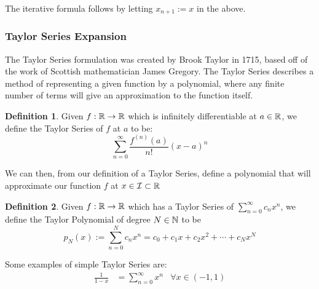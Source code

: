 The iterative formula follows by letting \(x_{n+1} := x\) in the above.\\




\subsubsection{Taylor Series Expansion}
\label{SUBSUB_"Taylor Series"}
\theoremstyle{definition}
\newtheorem{Taylor Series}{Definition}[subsubsection]
\newtheorem{Taylor Polynomial}[Taylor Series]{Definition}

The Taylor Series formulation was created by Brook Taylor in 1715, based off of the work of Scottish mathematician James Gregory. The Taylor Series describes a method of representing a given function by a polynomial, where any finite number of terms will give an approximation to the function itself.

\begin{Taylor Series}
\label{DEF_"Taylor Series"}
Given \(f : \mathbb{R} \to \mathbb{R}\) which is infinitely differentiable at \(a \in \mathbb{R}\), we define the Taylor Series of \(f\) at \(a\) to be:
\[\sum_{n=0}^{\infty} \frac{f^{(n)}(a)}{n!}(x-a)^n\]
\end{Taylor Series}

We can then, from our definition of a Taylor Series, define a polynomial that will approximate our function \(f\) at \(x \in \mathcal{I} \subset \mathbb{R}\)

\begin{Taylor Polynomial}
\label{DEF_"Taylor Polynomial"}
Given \(f : \mathbb{R} \to \mathbb{R}\) which has a Taylor Series of
\( \sum_{n=0}^\infty c_n x^n \), we define the Taylor Polynomial of degree \(N \in \mathbb{N}\) to be
\[ p_N(x) := \sum_{n=0}^N c_n x^n = c_0 + c_1 x + c_2 x^2 + \dotsb + c_N x^N\]
\end{Taylor Polynomial}

Some examples of simple Taylor Series are:
\begin{align*}
\frac{1}{1-x} &= \sum_{n=0}^\infty x^n &\forall x \in {({-1},1)}\\
\end{align*}



